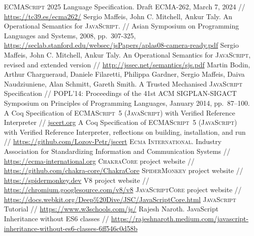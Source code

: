 \documentclass{article}
\newcommand{\js}{\textsc{JavaScript}\xspace}
\newcommand{\es}{\textsc{ECMAScript}\xspace}
\newcommand{\ecma}{\textsc{Ecma International}\xspace}
\begin{document}
\begin{thebibliography}{99}
  \es\textsuperscript{\textregistered} 2025 Language Specification. Draft ECMA-262, March 7, 2024 //
  \url{https://tc39.es/ecma262/}
  Sergio Maffeis, John C. Mitchell, Ankur Taly. An Operational Semantics for \js. // Asian Symposium on Programming Languages and Systems, 2008, pp.~307-325,
  \url{https://seclab.stanford.edu/websec/jsPapers/aplas08-camera-ready.pdf}
  Sergio Maffeis, John C. Mitchell, Ankur Taly. An Operational Semantics for \js, revised and extended version // \url{http://jssec.net/semantics/sjs.pdf}
  Martin Bodin, Arthur Chargueraud, Daniele Filaretti, Philippa Gardner, Sergio Maffeis, Daiva Naudziuniene, Alan Schmitt, Gareth Smith. A Trusted Mechanised \js Specification //
  POPL'14: Proceedings of the 41st ACM SIGPLAN-SIGACT Symposium on Principles of Programming Languages, January 2014, pp.~87–100.
  A Coq Specification of \es~5 (\js) with Verified Reference Interpreter // \url{jscert.org}
  A Coq Specification of \es~5 (\js) with Verified Reference Interpreter, reflections on building, installation, and run // \url{https://github.com/Lozov-Petr/jscert}  
 \ecma. Industry Association for Standardizing Information and Communication Systems // \url{https://ecma-international.org}
 \textsc{ChakraCore} project website // \url{https://github.com/chakra-core/ChakraCore}
 \textsc{SpiderMonkey} project website // \url{https://spidermonkey.dev}
 \textsc{V8} project website // \url{https://chromium.googlesource.com/v8/v8}
 \textsc{JavaScriptCore} project website // \url{https://docs.webkit.org/Deep%20Dive/JSC/JavaScriptCore.html}
 \js Tutorial // \url{https://www.w3schools.com/js/}
 Rajesh Naroth. JavaScript Inheritance without ES6 classes // \url{https://rajeshnaroth.medium.com/javascript-inheritance-without-es6-classes-6ff546c0d58b}
\end{thebibliography}
\end{document}
